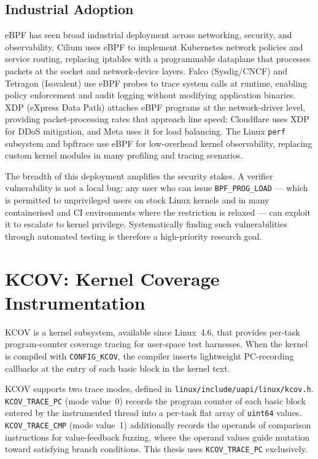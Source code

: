 \subsection{Industrial Adoption}
\label{sec:ebpf-adoption}

eBPF has seen broad industrial deployment across networking, security, and
observability.
Cilium uses eBPF to implement Kubernetes network policies and service routing,
replacing iptables with a programmable dataplane that processes packets at the
socket and network-device layers.
Falco (Sysdig/CNCF) and Tetragon (Isovalent) use eBPF probes to trace system calls at runtime,
enabling policy enforcement and audit logging without modifying application binaries.
XDP (eXpress Data Path) attaches eBPF programs at the network-driver level,
providing packet-processing rates that approach line speed; Cloudflare uses XDP
for DDoS mitigation, and Meta uses it for load balancing.
The Linux \texttt{perf} subsystem and bpftrace use eBPF for low-overhead kernel
observability, replacing custom kernel modules in many profiling and tracing
scenarios.

The breadth of this deployment amplifies the security stakes.
A verifier vulnerability is not a local bug: any user who can issue
\texttt{BPF\_PROG\_LOAD} --- which is permitted to unprivileged users on stock
Linux kernels and in many containerised and CI environments where the restriction
is relaxed --- can exploit it to escalate to kernel privilege.
Systematically finding such vulnerabilities through automated testing is therefore
a high-priority research goal.

\section{KCOV: Kernel Coverage Instrumentation}
\label{sec:kcov}

KCOV is a kernel subsystem, available since Linux~4.6, that provides per-task
program-counter coverage tracing for user-space test harnesses.
When the kernel is compiled with \texttt{CONFIG\_KCOV}, the compiler inserts
lightweight PC-recording callbacks at the entry of each basic block in the
kernel text.

KCOV supports two trace modes, defined in
\texttt{linux/include/uapi/linux/kcov.h}.
\texttt{KCOV\_TRACE\_PC} (mode value~0) records the program counter of each
basic block entered by the instrumented thread into a per-task flat array of
\texttt{uint64} values.
\texttt{KCOV\_TRACE\_CMP} (mode value~1) additionally records the operands of
comparison instructions for value-feedback fuzzing, where the operand values
guide mutation toward satisfying branch conditions.
This thesis uses \texttt{KCOV\_TRACE\_PC} exclusively.

